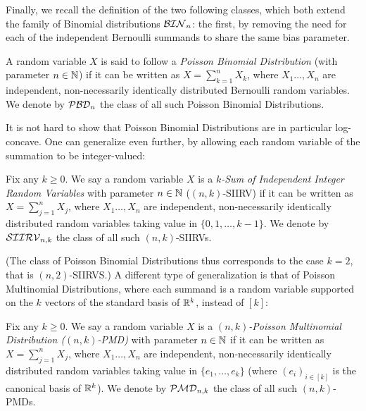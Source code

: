 Finally, we recall the definition of the two following classes, which both extend the family of Binomial distributions $\classbin[n]$: the first, by removing the need for each of the independent Bernoulli summands to share the same bias parameter.
\begin{definition}\label{def:pbd}
A random variable $X$ is said to follow a \emph{Poisson Binomial Distribution} (with parameter $n\in\N$) if it can be written as $X=\sum_{k=1}^n X_k$, where $X_1\dots,X_n$ are independent, non-necessarily identically distributed Bernoulli random variables. We denote by $\classpbd[n]$ the class of all such Poisson Binomial Distributions.
\end{definition}
\noindent It is not hard to show that Poisson Binomial Distributions are in particular log-concave. One can generalize even further, by allowing each random variable of the summation to be integer-valued:
\begin{definition}\label{def:siirv}
Fix any $k\geq 0$. We say a random variable $X$ is a \emph{$k$-Sum of Independent Integer Random Variables} with parameter $n\in\N$ ($(n,k)$-SIIRV) if it can be written as $X=\sum_{j=1}^n X_j$, where $X_1\dots,X_n$ are independent, non-necessarily identically distributed random variables taking value in $\{0,1,\dots,k-1\}$. We denote by $\classksiirv[n]{k}$ the class of all such $(n,k)$-SIIRVs.
\end{definition}
\noindent (The class of Poisson Binomial Distributions thus corresponds to the case $k=2$, that is $(n,2)$-SIIRVS.) A different type of generalization is that of Poisson Multinomial Distributions, where each summand is a random variable supported on the $k$ vectors of the standard basis of $\R^k$, instead of $[k]$:
\begin{definition}\label{def:pmd}
Fix any $k\geq 0$. We say a random variable $X$ is a \emph{$(n,k)$-Poisson Multinomial Distribution ($(n,k)$-PMD)} with parameter $n\in\N$ if it can be written as $X=\sum_{j=1}^n X_j$, where $X_1\dots,X_n$ are independent, non-necessarily identically distributed random variables taking value in $\{e_1,\dots,e_k\}$ (where $(e_i)_{i\in[k]}$ is the canonical basis of $\R^k$). We denote by $\classpmd[n]{k}$ the class of all such $(n,k)$-PMDs.
\end{definition}

